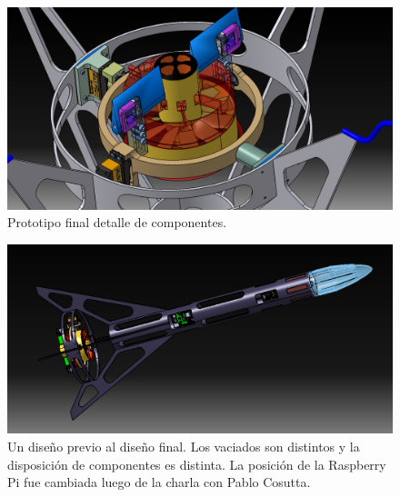 \begin{figure}[htb]
    \centering
    \includegraphics[height=0.25\pdfpageheight]{fig/design/v6_6}
    \caption{Prototipo final detalle de componentes.}
    \label{fig:design/v6_6}
\end{figure}

\begin{figure}[htb]
    \centering
    \includegraphics[width=\linewidth]{fig/design/4}
    \caption{Un diseño previo al diseño final. Los vaciados son distintos y la disposición de componentes es distinta. La posición de la Raspberry Pi fue cambiada luego de la charla con Pablo Cosutta.}
    \label{fig:design/4}
\end{figure}


\null\newpage
\clearpage

